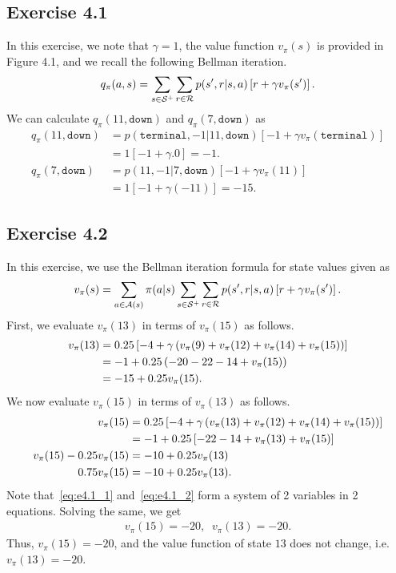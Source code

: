 \documentclass[10pt]{article}
\begin{document}
	 \subsection*{Exercise 4.1}
	 \label{ss:4.1}
	 In this exercise, we note that $\gamma=1$, the value function $v_\pi(s)$ is provided in Figure 4.1, and we recall the following Bellman iteration.
	 \begin{align*}
	 q_\pi(a,s) = \sum_{s\in\mathcal{S}^+}\sum_{r\in\mathcal{R}} p(s',r|s,a) \left[ r + \gamma v_\pi (s') \right].
	 \end{align*}
	 We can calculate $q_\pi(11,\texttt{down})$ and $q_\pi(7,\texttt{down})$ as
	 \begin{align*}
	 q_\pi(11,\texttt{down}) &= p(\texttt{terminal},-1|11,\texttt{down}) \left[ -1 + \gamma v_\pi (\texttt{terminal}) \right]\\
	 &= 1\left[ -1 + \gamma.0 \right] = -1.\\
	 q_\pi(7,\texttt{down}) &= p(11,-1|7,\texttt{down}) \left[ -1 + \gamma v_\pi (11) \right]\\
	 &= 1\left[ -1+\gamma(-11) \right] = -15.
	 \end{align*}
	 \subsection*{Exercise 4.2}
	 \label{ss:4.2}
	 In this exercise, we use the Bellman iteration formula for state values given as
	 \begin{align*}
	 v_\pi(s) = \sum_{a\in\mathcal{A}(s)} \pi(a|s) \sum_{s\in\mathcal{S}^+} \sum_{r\in\mathcal{R}} p(s',r|s,a)\left[ r + \gamma v_\pi (s') \right].
	 \end{align*}
	 First, we evaluate $v_\pi(13)$ in terms of $v_\pi(15)$ as follows.
	 \begin{align}
	 \notag
	 v_\pi(13) &= 0.25 \left[ -4 + \gamma \left( v_\pi(9) + v_\pi(12) + v_\pi(14) + v_\pi(15) \right) \right]\\
	 \notag
	 &= -1 + 0.25 \left( -20 -22 -14 + v_\pi(15) \right)\\
	 \label{eq:e4.1_1}
	 &= -15 + 0.25 v_\pi(15).
	 \end{align}
	 We now evaluate $v_\pi(15)$ in terms of $v_\pi(13)$ as follows.
	 \begin{align}
	 \notag
	 v_\pi(15) &= 0.25 \left[ -4 + \gamma \left( v_\pi(13) + v_\pi(12) + v_\pi(14) + v_\pi(15) \right) \right]\\
	 \notag
	 &= -1 + 0.25 \left[ -22 -14 + v_\pi(13) + v_\pi(15) \right]\\
	 \notag
	 v_\pi(15) - 0.25 v_\pi(15) &= -10 + 0.25v_\pi(13)\\
	 \label{eq:e4.1_2}
	 0.75v_\pi(15) &= -10 + 0.25v_\pi(13).
	 \end{align}
	 Note that~\eqref{eq:e4.1_1} and~\eqref{eq:e4.1_2} form a system of 2 variables in 2 equations. Solving the same, we get
	 \begin{align*}
	 v_\pi(15) = -20, \; \; v_\pi(13) = -20.
	 \end{align*}
	 Thus, $v_\pi(15) = -20$, and the value function of state $13$ does not change, i.e. $v_\pi(13) = -20$.
\end{document}
